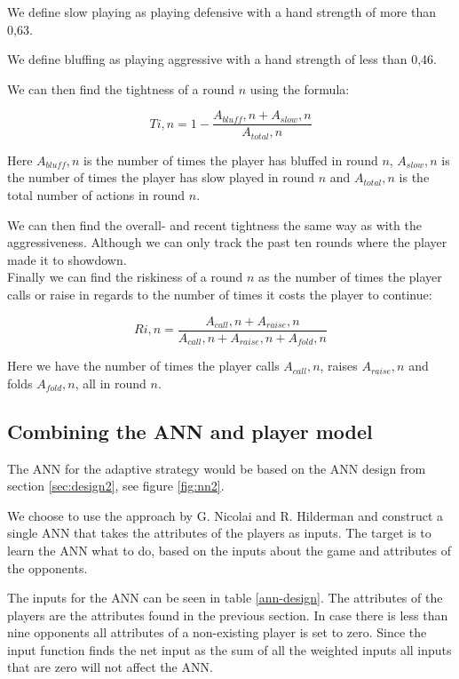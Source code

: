 We define slow playing as playing defensive with a hand strength of more than 0,63.

We define bluffing as playing aggressive with a hand strength of less than 0,46.

We can then find the tightness of a round $n$ using the formula:

\[Ti,n = 1 - \frac{A_{bluff},n + A_{slow},n}{A_{total},n}\]

Here $A_{bluff},n$ is the number of times the player has bluffed in round $n$, $A_{slow},n$ is the number of times the player has slow played in round $n$ and $A_{total},n$ is the total number of actions in round $n$.

We can then find the overall- and recent tightness the same way as with the aggressiveness. Although we can only track the past ten rounds where the player made it to showdown.\\

Finally we can find the riskiness of a round $n$ as the number of times the player calls or raise in regards to the number of times it costs the player to continue:

\[Ri,n = \frac{A_{call},n + A_{raise},n}{A_{call},n + A_{raise},n + A_{fold},n}\]

Here we have the number of times the player calls $A_{call},n$, raises $A_{raise},n$ and folds $A_{fold},n$, all in round $n$.

\subsection{Combining the ANN and player model}
The ANN for the adaptive strategy would be based on the ANN design from section \ref{sec:design2}, see figure \ref{fig:nn2}. 



We choose to use the approach by G. Nicolai and R. Hilderman and construct a single ANN that takes the attributes of the players as inputs. The target is to learn the ANN what to do, based on the inputs about the game and attributes of the opponents.

The inputs for the ANN can be seen in table \ref{ann-design}. The attributes of the players are the attributes found in the previous section. In case there is less than nine opponents all attributes of a non-existing player is set to zero. Since the input function finds the net input as the sum of all the weighted inputs all inputs that are zero will not affect the ANN.


